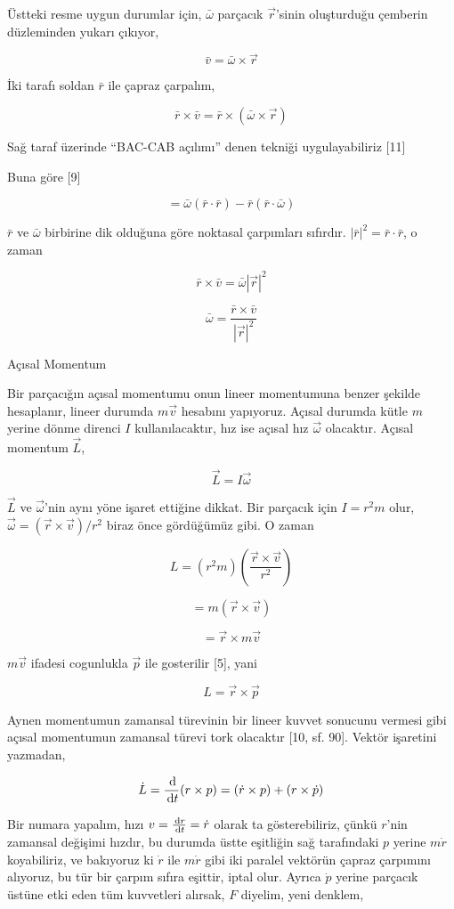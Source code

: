 \documentclass[12pt,fleqn]{article}\usepackage{../../common}
\begin{document}
Üstteki resme uygun durumlar için, $\bar{\omega}$ parçacık $\vec{r}$'sinin
oluşturduğu çemberin düzleminden yukarı çıkıyor,


$$ \bar{v} = \bar{\omega} \times \vec{r}
$$

İki tarafı soldan $\bar{r}$ ile çapraz çarpalım,

$$
\bar{r} \times \bar{v} = \bar{r} \times (\bar{\omega} \times \vec{r})
$$

Sağ taraf üzerinde ``BAC-CAB açılımı'' denen tekniği uygulayabiliriz [11]

Buna göre [9]

$$
= \bar{\omega} (\bar{r} \cdot \bar{r}) - \bar{r}(\bar{r} \cdot \bar{\omega})
$$

$\bar{r}$ ve $\bar{\omega}$ birbirine dik olduğuna göre noktasal çarpımları
sıfırdır. $|\bar{r}|^2 = \bar{r} \cdot \bar{r}$, o zaman

$$
\bar{r} \times \bar{v}  = \bar{\omega} |\vec{r}|^2
$$

$$
\bar{\omega}  = \frac{\bar{r} \times \bar{v}}{|\vec{r}|^2} 
$$

Açısal Momentum

Bir parçacığın açısal momentumu onun lineer momentumuna benzer şekilde
hesaplanır, lineer durumda $m \vec{v}$ hesabını yapıyoruz. Açısal durumda kütle
$m$ yerine dönme direnci $I$ kullanılacaktır, hız ise açısal hız $\vec{\omega}$
olacaktır. Açısal momentum $\vec{L}$,

$$
\vec{L} = I \vec{\omega}
$$

$\vec{L}$ ve $\vec{\omega}$'nin aynı yöne işaret ettiğine dikkat. Bir parçacık 
için $I = r^2 m$ olur, $\vec{\omega} = (\vec{r} \times \vec{v}) / r^2$ biraz
önce gördüğümüz gibi. O zaman

$$
L = (r^2 m) \left( \frac{\vec{r} \times \vec{v}}{r^2}  \right)
$$

$$
= m (\vec{r} \times \vec{v})
$$

$$
 = \vec{r} \times m\vec{v}
$$

$m\vec{v}$ ifadesi cogunlukla $\vec{p}$ ile gosterilir [5], yani

$$
L = \vec{r} \times \vec{p}
$$

Aynen momentumun zamansal türevinin bir lineer kuvvet sonucunu vermesi gibi
açısal momentumun zamansal türevi tork olacaktır [10, sf. 90]. Vektör işaretini
yazmadan,

$$
\dot{L} = \frac{\,\mathrm{d} }{\,\mathrm{d} t} (r \times p)  =
(\dot{r} \times p) + (r \times \dot{p})
$$

Bir numara yapalım, hızı $v = \frac{\,\mathrm{d} r}{\,\mathrm{d} t} = \dot{r}$ olarak ta
gösterebiliriz, çünkü $r$'nin zamansal değişimi hızdır, bu durumda üstte
eşitliğin sağ tarafındaki $p$ yerine $m\dot{r}$ koyabiliriz, ve bakıyoruz ki
$\dot{r}$ ile $m\dot{r}$ gibi iki paralel vektörün çapraz çarpımını alıyoruz, bu
tür bir çarpım sıfıra eşittir, iptal olur. Ayrıca $\dot{p}$ yerine parçacık
üstüne etki eden tüm kuvvetleri alırsak, $F$ diyelim, yeni denklem,
\end{document}
